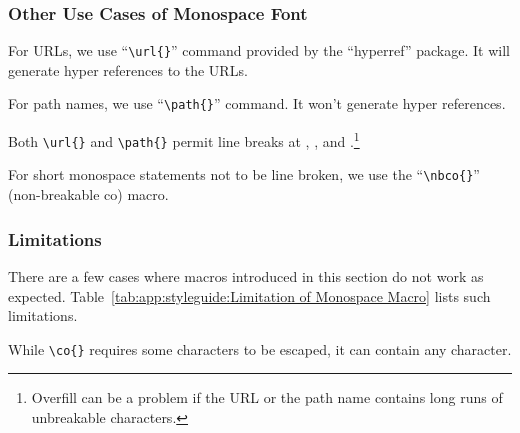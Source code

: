 \subsubsection{Other Use Cases of Monospace Font}
\label{sec:app:styleguide:Other Use Cases of Monospace Font}

For URLs, we use ``\verb|\url{}|'' command provided by the
``hyperref'' package. It will generate hyper references to the
URLs.

For path names, we use ``\verb|\path{}|'' command. It won't
generate hyper references.

Both \verb|\url{}| and \verb|\path{}| permit line breaks
at \qco{/}, \qco{-}, and .\footnote{
  Overfill can be a problem if the URL or the path name contains
  long runs of unbreakable characters.
}

For short monospace statements not to be line broken, we use
the ``\verb|\nbco{}|'' (non-breakable co) macro.

\subsubsection{Limitations}
\label{sec:app:styleguide:Limitations}

There are a few cases where macros introduced in this section
do not work as expected.
Table~\ref{tab:app:styleguide:Limitation of Monospace Macro}
lists such limitations.

\begin{table}[tbh]
  \renewcommand*{\arraystretch}{1.2}
  \begin{floatrow}[1]
  \end{floatrow}
\end{table}

While \verb|\co{}| requires some characters to be escaped,
it can contain any character.


